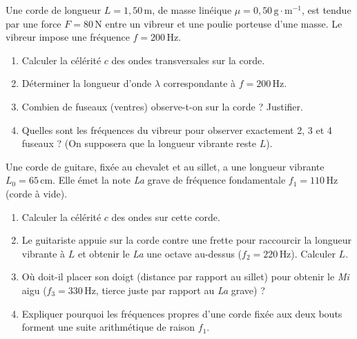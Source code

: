 \documentclass[11pt]{article}
\newcounter{popsec}
\newcounter{popsub}
\newcommand{\courssub}[1]{%
  \stepcounter{popsub}%
  \par\vspace{9pt}\noindent{\popxbold\fontsize{11.5}{13}\selectfont\color{popink}{\color{poporange}\thepopsec.\thepopsub}\hspace{6pt}#1}\par\nopagebreak\vspace{4pt}
}
\begin{document}
\begin{exercice}
Une corde de longueur $L = 1,50\,\text{m}$, de masse linéique $\mu = 0,50\,\text{g}\cdot\text{m}^{-1}$, est tendue par une force $F = 80\,\text{N}$ entre un vibreur et une poulie porteuse d'une masse. Le vibreur impose une fréquence $f = 200\,\text{Hz}$.
\begin{enumerate}
    \item Calculer la célérité $c$ des ondes transversales sur la corde.
    \item Déterminer la longueur d'onde $\lambda$ correspondante à $f = 200\,\text{Hz}$.
    \item Combien de fuseaux (ventres) observe-t-on sur la corde ? Justifier.
    \item Quelles sont les fréquences du vibreur pour observer exactement 2, 3 et 4 fuseaux ? (On supposera que la longueur vibrante reste $L$).
\end{enumerate}
\end{exercice}

\begin{exercice}
Une corde de guitare, fixée au chevalet et au sillet, a une longueur vibrante $L_0 = 65\,\text{cm}$. Elle émet la note \emph{La} grave de fréquence fondamentale $f_1 = 110\,\text{Hz}$ (corde à vide).
\begin{enumerate}
    \item Calculer la célérité $c$ des ondes sur cette corde.
    \item Le guitariste appuie sur la corde contre une frette pour raccourcir la longueur vibrante à $L$ et obtenir le \emph{La} une octave au-dessus ($f_2 = 220\,\text{Hz}$). Calculer $L$.
    \item Où doit-il placer son doigt (distance par rapport au sillet) pour obtenir le \emph{Mi} aigu ($f_3 = 330\,\text{Hz}$, tierce juste par rapport au \emph{La} grave) ?
    \item Expliquer pourquoi les fréquences propres d'une corde fixée aux deux bouts forment une suite arithmétique de raison $f_1$.
\end{enumerate}
\end{exercice}

\courssub{Je me prépare au Bac}
\end{document}
